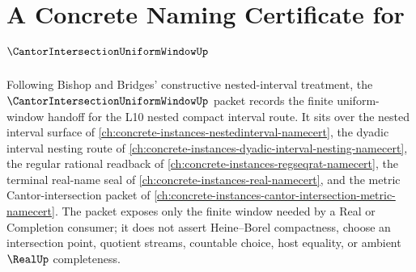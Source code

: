 \chapter{A Concrete Naming Certificate for $\CantorIntersectionUniformWindowUp$}
\label{ch:concrete-instances-cantor-intersection-uniform-window-namecert}

Following Bishop and Bridges' constructive nested-interval treatment, the $\CantorIntersectionUniformWindowUp$ packet records the finite uniform-window handoff for the L10 nested compact interval route. It sits over the nested interval surface of \autoref{ch:concrete-instances-nestedinterval-namecert}, the dyadic interval nesting route of \autoref{ch:concrete-instances-dyadic-interval-nesting-namecert}, the regular rational readback of \autoref{ch:concrete-instances-regseqrat-namecert}, the terminal real-name seal of \autoref{ch:concrete-instances-real-namecert}, and the metric Cantor-intersection packet of \autoref{ch:concrete-instances-cantor-intersection-metric-namecert}. The packet exposes only the finite window needed by a Real or Completion consumer; it does not assert Heine--Borel compactness, choose an intersection point, quotient streams, countable choice, host equality, or ambient $\RealUp$ completeness.

